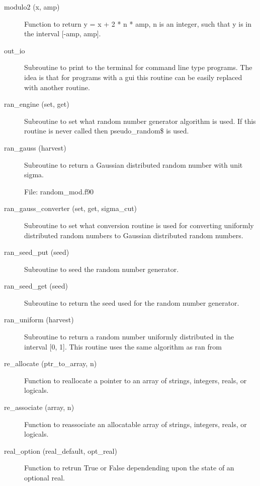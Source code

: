\begin{description}
\item[modulo2 (x, amp)] \Newline 
Function to return y = x + 2 * n * amp, n is an integer, such that y is 
in the interval [-amp, amp].

\item[out_io] \Newline 
Subroutine to print to the terminal for command line type programs.
The idea is that for programs with a gui this routine can be easily
replaced with another routine.

\item[ran_engine (set, get)] \Newline 
Subroutine to set what random number generator algorithm is used.
If this routine is never called then pseudo_random\$ is used.

\item[ran_gauss (harvest)] \Newline 
Subroutine to return a Gaussian distributed random number with unit sigma.

File: random_mod.f90
\item[ran_gauss_converter (set, get, sigma_cut)] \Newline 
Subroutine to set what conversion routine is used for converting
uniformly distributed random numbers to Gaussian distributed random numbers.

\item[ran_seed_put (seed)] \Newline 
Subroutine to seed the random number generator. 

\item[ran_seed_get (seed)] \Newline 
Subroutine to return the seed used for the random number generator.

\item[ran_uniform (harvest)] \Newline 
Subroutine to return a random number uniformly distributed in the 
interval [0, 1]. This routine uses the same algorithm as ran from

\item[re_allocate (ptr_to_array, n)] \Newline 
Function to reallocate a pointer to an array of strings, integers, reals, or logicals.

\item[re_associate (array, n)] \Newline 
Function to reassociate an allocatable array of strings, integers, reals, or logicals.

\item[real_option (real_default, opt_real)] \Newline 
Function to retrun True or False dependending upon the state of an 
optional real.


\end{description}
